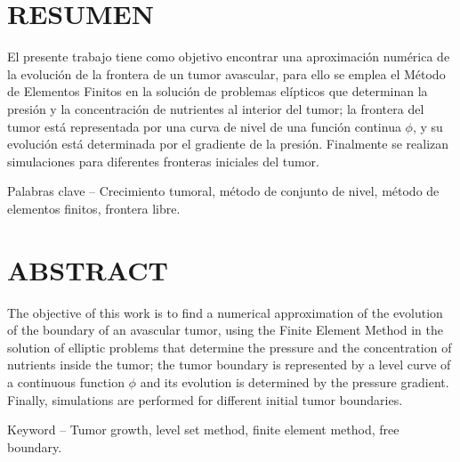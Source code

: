 \chapter*{\MakeUppercase{Resumen}}
\thispagestyle{fancy}
\noindent El presente trabajo tiene como objetivo encontrar una aproximación numérica de la evolución de la frontera de un tumor avascular, para ello se emplea el Método de Elementos Finitos en la solución de problemas elípticos que determinan la presión y la concentración de nutrientes al interior del tumor; la frontera del tumor está representada por una curva de nivel de una función continua $\phi$, y su evolución está determinada por el gradiente de la presión. Finalmente se realizan simulaciones para diferentes fronteras iniciales del tumor.

\noindent Palabras clave -- Crecimiento tumoral, método de conjunto de nivel, método de elementos  finitos, frontera libre.
\chapter*{\MakeUppercase{Abstract}}
\thispagestyle{fancy}
\noindent The objective of this work is to find a numerical approximation of the evolution of the boundary of an avascular tumor, using the Finite Element Method in the solution of elliptic problems that determine the pressure and the concentration of nutrients inside the tumor; the tumor boundary is represented by a level curve of a continuous function $\phi$ and its evolution is determined by the pressure gradient. Finally, simulations are performed for different initial tumor boundaries.

\noindent Keyword --  Tumor growth, level set method, finite element method, free boundary.